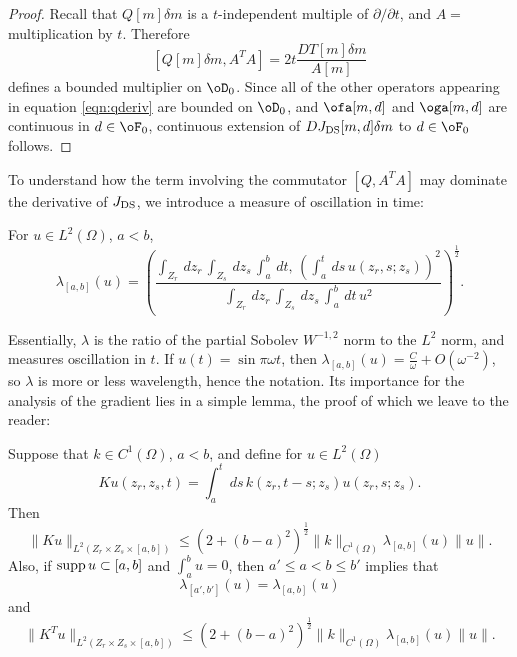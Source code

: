 \begin{proof}
Recall that $Q[m]\delta m$ is a $t$-independent multiple of
$\partial/\partial t$, and $A = $ multiplication by $t$. Therefore
\begin{equation}
\label{eqn:qcommdt}
[Q[m]\delta m,A^TA] = 2t\frac{DT[m]\delta m}{A[m]}
\end{equation}
defines a bounded multiplier on $\oD_0$. Since all of the other operators
appearing in equation \ref{eqn:qderiv} are bounded on $\oD_0$, and
$\ofa[m,d]$ and $\oga[m,d]$ are continuous in $d \in \oF_0$, 
continuous extension of $DJ_{\rm DS}[m,d]\delta m$ to $d \in \oF_0$ follows.
\end{proof}

To understand how the term involving the commutator $[Q,A^TA]$ may
dominate the derivative of $J_{\rm DS}$, we introduce a measure of
oscillation in time:

\begin{definition} For $u \in L^2(\Omega)$, $a < b$,
\begin{equation}
\label{eqn:lamdef}
\lambda_{[a,b]}(u) =
\left(\frac{\int_{Z_r}\,dz_r\,\int_{Z_s}\,dz_s\,\int_a^b\,dt,\,\left(\int_a^t\,ds\,u(z_r,s;z_s)\right)^2}{\int_{Z_r}\,dz_r\,\int_{Z_s}\,dz_s\,\int_a^b\,dt\,u^2}\right)^{\frac{1}{2}}.
\end{equation}
\end{definition}
Essentially, $\lambda$ is the ratio of the partial Sobolev $W^{-1,2}$ norm to
the $L^2$ norm, and measures oscillation in $t$. If $u(t) = \sin \pi \omega
t$, then $\lambda_{[a,b]}(u) = \frac{C}{ \omega} + O(\omega^{-2})$, so
$\lambda$ is more or less wavelength, hence the notation. Its
importance for the analysis of the gradient lies in a simple lemma,
the proof of which we leave to the reader:

\begin{lem}
\label{lem:lamlem}
Suppose that $k \in C^1(\Omega)$, $a < b$, and define for $u \in L^2(\Omega)$
\[
Ku(z_r,z_s,t) = \int_a^t\,ds\,k(z_r,t-s;z_s) u(z_r,s;z_s).
\]
Then 
\[
\|Ku\|_{L^2(Z_r\times Z_s \times [a,b])} \le
(2+(b-a)^2)^{\frac{1}{2}}\|k\|_{C^1(\Omega)}\lambda_{[a,b]}(u)\|u\|.
\]
Also, if ${\rm supp} \,u \subset [a,b]$ and $\int_a^bu = 0$, then $a' \le a < b \le b'$
implies that
\[
\lambda_{[a',b']}(u) = \lambda_{[a,b]}(u)
\]
and
\[
\|K^Tu\|_{L^2(Z_r\times Z_s \times [a,b])} \le
(2+(b-a)^2)^{\frac{1}{2}}\|k\|_{C^1(\Omega)}\lambda_{[a,b]}(u)\|u\|.
\]
\end{lem}

